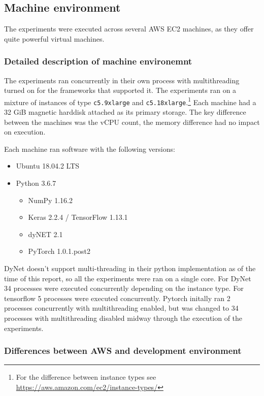 \subsection{Machine environment}

The experiments were executed across several AWS EC2 machines, as they offer
quite powerful virtual machines.

\subsubsection{Detailed description of machine environemnt}

The experiments ran concurrently in their own process with multithreading
turned on for the frameworks that supported it. The experiments ran on a
mixture of instances of type \texttt{c5.9xlarge} and
\texttt{c5.18xlarge}.\footnote{For the difference between instance types see
\url{https://aws.amazon.com/ec2/instance-types/}}
Each machine had a 32 GiB magnetic harddisk attached as its primary storage.
The key difference between the machines was the vCPU count, the memory
difference had no impact on execution.

Each machine ran software with the following versions:
\begin{itemize}
  \item{Ubuntu 18.04.2 LTS}
  \item{Python 3.6.7}
  \begin{itemize}
    \item{NumPy 1.16.2}
    \item{Keras 2.2.4 / TensorFlow 1.13.1}
    \item{dyNET 2.1}
    \item{PyTorch 1.0.1.post2}
  \end{itemize}
\end{itemize}

DyNet doesn't support multi-threading in their python implementation as of the
time of this report, so all the experiments were ran on a single core. 
For DyNet 34 processes were executed concurrently depending on the
instance type.
For tensorflow 5 processes were executed concurrently.
Pytorch initally ran 2 processes concurrently with multithreading enabled, but
was changed to 34 processes with multithreading disabled midway through the
execution of the experiments.

\subsubsection{Differences between AWS and development environment}

